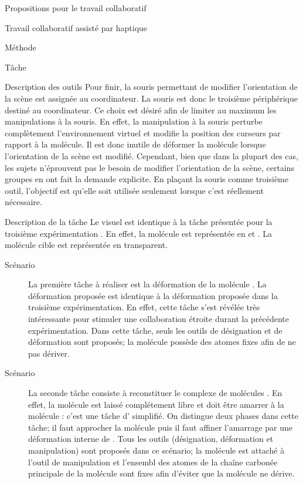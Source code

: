 \documentclass[myfrancais]{mythesis}
\begin{document}
\begin{mypart}{Propositions pour le travail collaboratif}
\begin{mychapter}{Travail collaboratif assisté par haptique}
\begin{mysection}{Méthode}
\begin{mysubsection}{Tâche}
\begin{mysubsubsection}{Description des outils}
						Pour finir, la souris permettant de modifier l'orientation de la scène est assignée au coordinateur.
						La souris est donc le troisième périphérique destiné au coordinateur.
						Ce choix est désiré afin de limiter au maximum les manipulations à la souris.
						En effet, la manipulation à la souris perturbe complètement l'environnement virtuel et modifie la position des curseurs par rapport à la molécule.
						Il est donc inutile de déformer la molécule lorsque l'orientation de la scène est modifié.
						Cependant, bien que dans la plupart des cas, les sujets n'éprouvent pas le besoin de modifier l'orientation de la scène, certains groupes en ont fait la demande explicite.
						En plaçant la souris comme troisième outil, l'objectif est qu'elle soit utilisée seulement lorsque c'est réellement nécessaire.
					\end{mysubsubsection}
					\begin{mysubsubsection}{Description de la tâche}
						Le visuel est identique à la tâche présentée pour la troisième expérimentation .
						En effet, la molécule est représentée en \myCPK et \myNewRibbon.
						La molécule cible est représentée en \myNewRibbon transparent.
						\begin{description}
							\item[Scénario~]
								La première tâche à réaliser est la déformation de la molécule \myUbiquitin.
								La déformation proposée est identique à la déformation proposée dans la troisième expérimentation.
								En effet, cette tâche s'est révélée très intéressante pour stimuler une collaboration étroite durant la précédente expérimentation.
								Dans cette tâche, seuls les outils de désignation et de déformation sont proposés; la molécule \myUbiquitin possède des atomes fixes afin de ne pas dériver.
							\item[Scénario~]
								La seconde tâche consiste à reconstituer le complexe de molécules \myNusENusG.
								En effet, la molécule \myNusG est laissé complétement libre et doit être amarrer à la molécule \myNusE : c'est une tâche d' simplifié.
								On distingue deux phases dans cette tâche; il faut approcher la molécule \myNusG puis il faut affiner l'amarrage par une déformation interne de \myNusG.
								Tous les outils (désignation, déformation et manipulation) sont proposés dans ce scénario; la molécule \myNusG est attaché à l'outil de manipulation et l'ensembl des atomes de la chaîne carbonée principale de la molécule \myNusE sont fixes afin d'éviter que la molécule ne dérive.
						\end{description}


\end{mysubsubsection}
\end{mysubsection}
\end{mysection}
\end{mychapter}
\end{mypart}
\end{document}
